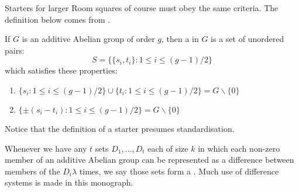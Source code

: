 Starters for larger Room squares of course must obey the same criteria.
The definition below comes from
\cite{dinitzContemporaryDesignTheory1992}.

If $G$ is an additive Abelian group of order $g$, then a  in $G$ is a set of unordered pairs:
\begin{equation*}
S = \{\{s_i, t_i\}:1 \leq i \leq (g - 1)/2\}
\end{equation*}
which satisfies these properties:

\begin{enumerate}
  \item{$\{s_i:1 \leq i \leq (g-1)/2\} \cup \{t_i : 1 \leq i \leq (g-1)/2\} = G \backslash \{0\}$}
  \item{$\{\pm (s_i - t_i ) : 1 \leq i \leq (g-1)/2 \} = G \backslash \{0\}$}
\end{enumerate}

Notice that the definition of a starter presumes standardisation.

Whenever we have any $t$ sets $D_1, \ldots, D_t$ each of size $k$ in which each non-zero member of an additive Abelian group can be represented as a difference between members of the $D_i \lambda$ times, we say those sets form a .
Much use of difference systems is made in this monograph.


